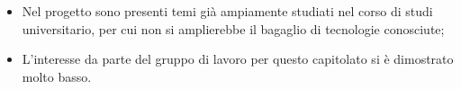 \begin{itemize}
\item Nel progetto sono presenti temi già ampiamente studiati nel corso di studi universitario, per cui non si amplierebbe il bagaglio di tecnologie conosciute;
\item L'interesse da parte del gruppo di lavoro per questo capitolato si è dimostrato molto basso.

\end{itemize}